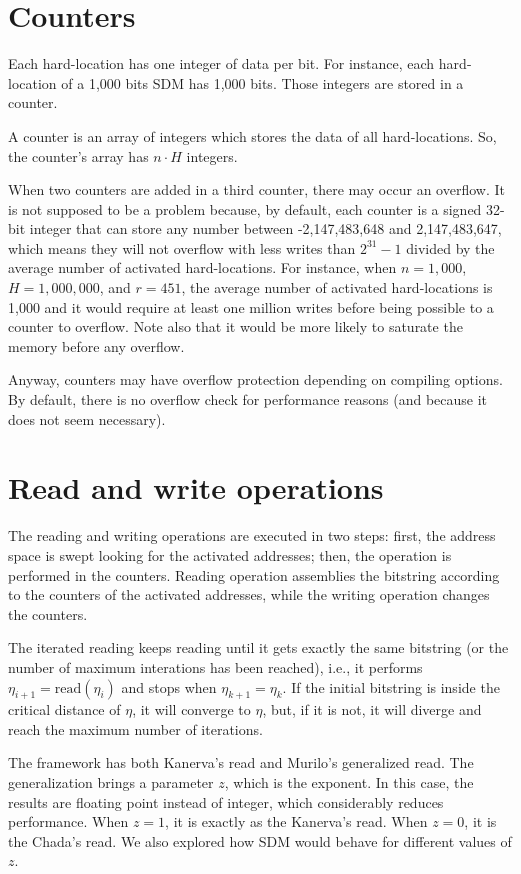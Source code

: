 \section{Counters}

Each hard-location has one integer of data per bit. For instance, each hard-location of a 1,000 bits SDM has 1,000 bits. Those integers are stored in a counter.

A counter is an array of integers which stores the data of all hard-locations. So, the counter's array has $n \cdot H$ integers.

When two counters are added in a third counter, there may occur an overflow. It is not supposed to be a problem because, by default, each counter is a signed 32-bit integer that can store any number between -2,147,483,648 and 2,147,483,647, which means they will not overflow with less writes than $2^{31}-1$ divided by the average number of activated hard-locations. For instance, when $n=1,000$, $H=1,000,000$, and $r=451$, the average number of activated hard-locations is 1,000 and it would require at least one million writes before being possible to a counter to overflow.  Note also that it would be more likely to saturate the memory before any overflow.

Anyway, counters may have overflow protection depending on compiling options. By default, there is no overflow check for performance reasons (and because it does not seem necessary).

\section{Read and write operations}

The reading and writing operations are executed in two steps: first, the address space is swept looking for the activated addresses; then, the operation is performed in the counters. Reading operation assemblies the bitstring according to the counters of the activated addresses, while the writing operation changes the counters.

The iterated reading keeps reading until it gets exactly the same bitstring (or the number of maximum interations has been reached), i.e., it performs $\eta_{i+1} = \text{read}(\eta_i)$ and stops when $\eta_{k+1} = \eta_{k}$. If the initial bitstring is inside the critical distance of $\eta$, it will converge to $\eta$, but, if it is not, it will diverge and reach the maximum number of iterations.

The framework has both Kanerva's read and Murilo's generalized read. The generalization brings a parameter $z$, which is the exponent. In this case, the results are floating point instead of integer, which considerably reduces performance. When $z=1$, it is exactly as the Kanerva's read. When $z=0$, it is the Chada's read. We also explored how SDM would behave for different values of $z$.

